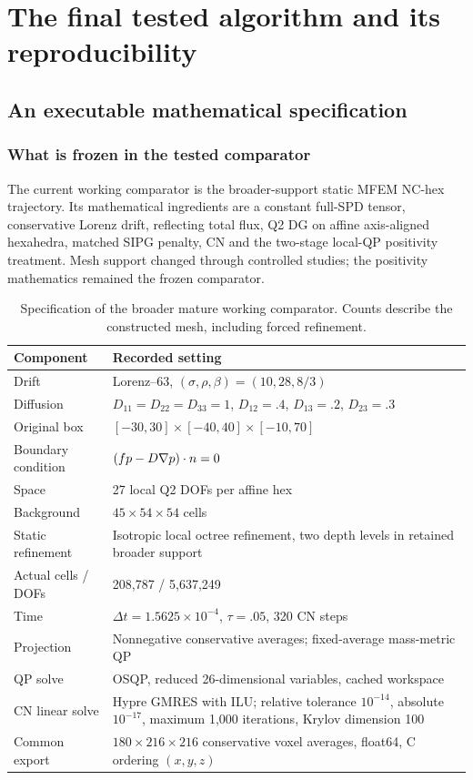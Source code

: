 \part{The final tested algorithm and its reproducibility}
\chapter{An executable mathematical specification}
\section{What is frozen in the tested comparator}
The current working comparator is the broader-support static MFEM NC-hex trajectory. Its mathematical ingredients are a constant full-SPD tensor, conservative Lorenz drift, reflecting total flux, Q2 DG on affine axis-aligned hexahedra, matched SIPG penalty, CN and the two-stage local-QP positivity treatment. Mesh support changed through controlled studies; the positivity mathematics remained the frozen comparator.

\begin{table}[htbp]\centering\caption{Specification of the broader mature working comparator. Counts describe the constructed mesh, including forced refinement.}\label{tab:finalspec}
\begin{tabular}{p{}p{}}\toprule Component & Recorded setting\\\midrule
Drift & Lorenz--63, $(\sigma,\rho,\beta)=(10,28,8/3)$\\
Diffusion & $D_{11}=D_{22}=D_{33}=1$, $D_{12}=.4$, $D_{13}=.2$, $D_{23}=.3$\\
Original box & $[-30,30]\times[-40,40]\times[-10,70]$\\
Boundary condition & $(fp-D\nabla p)\cdot n=0$\\
Space & 27 local Q2 DOFs per affine hex\\
Background & $45\times54\times54$ cells\\
Static refinement & Isotropic local octree refinement, two depth levels in retained broader support\\
Actual cells / DOFs & 208,787 / 5,637,249\\
Time & $\Delta t=1.5625\times10^{-4}$, $\tau=.05$, 320 CN steps\\
Projection & Nonnegative conservative averages; fixed-average mass-metric QP\\
QP solve & OSQP, reduced 26-dimensional variables, cached workspace\\
CN linear solve & Hypre GMRES with ILU; relative tolerance $10^{-14}$, absolute $10^{-17}$, maximum 1,000 iterations, Krylov dimension 100\\
Common export & $180\times216\times216$ conservative voxel averages, float64, C ordering $(x,y,z)$\\\bottomrule\end{tabular}\end{table}

